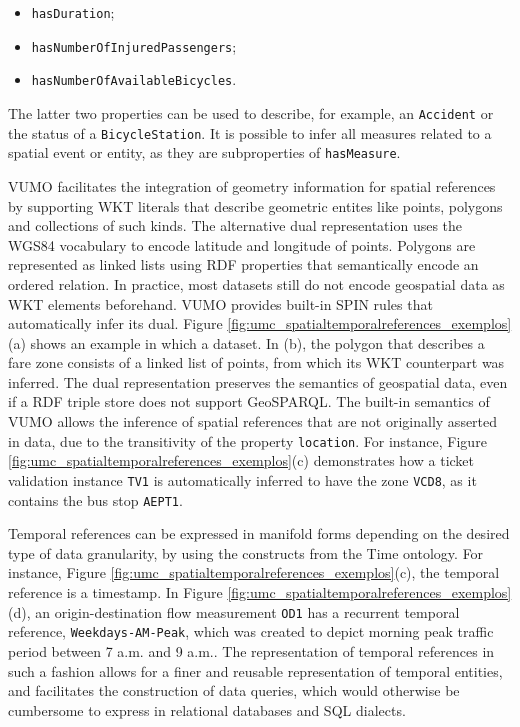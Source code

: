 \documentclass[]{interact}
\theoremstyle{plain}%
\theoremstyle{definition}
\theoremstyle{remark}
\theoremstyle{definition}
\begin{document}
\begin{itemize}
	\item \texttt{hasDuration};
	\item \texttt{hasNumberOfInjuredPassengers};
	\item \texttt{hasNumberOfAvailableBicycles}.
\end{itemize}

The latter two properties can be used to describe, for example, an \texttt{Accident} or the status of a \texttt{BicycleStation}. It is possible to infer all measures related to a spatial event or entity, as they are subproperties of \texttt{hasMeasure}.

VUMO facilitates the integration of geometry information for spatial references by supporting WKT literals that describe geometric entites like points, polygons and collections of such kinds. The alternative dual representation uses the WGS84 vocabulary to encode latitude and longitude of points. Polygons are represented as linked lists using RDF properties that semantically encode an ordered relation. In practice, most datasets still do not encode geospatial data as WKT elements beforehand. VUMO provides built-in SPIN rules that automatically infer its dual. Figure \ref{fig:umc_spatialtemporalreferences_exemplos}(a) shows an example in which a dataset. In (b), the polygon that describes a fare zone consists of a linked list of points, from which its WKT counterpart was inferred. The dual representation preserves the semantics of geospatial data, even if a RDF triple store does not support GeoSPARQL. The built-in semantics of VUMO allows the inference of spatial references that are not originally asserted in data, due to the transitivity of the property \texttt{location}. For instance, Figure \ref{fig:umc_spatialtemporalreferences_exemplos}(c) demonstrates how a ticket validation instance \texttt{TV1} is automatically inferred to have the zone \texttt{VCD8}, as it contains the bus stop \texttt{AEPT1}.

Temporal references can be expressed in manifold forms depending on the desired type of data granularity, by using the constructs from the Time ontology. For instance, Figure \ref{fig:umc_spatialtemporalreferences_exemplos}(c), the temporal reference is a timestamp. In Figure \ref{fig:umc_spatialtemporalreferences_exemplos}(d), an origin-destination flow measurement \texttt{OD1} has a recurrent temporal reference, \texttt{Weekdays-AM-Peak}, which was created to depict morning peak traffic period between 7 a.m. and 9 a.m.. The representation of temporal references in such a fashion allows for a finer and reusable representation of temporal entities, and facilitates the construction of data queries, which would otherwise be cumbersome to express in relational databases and SQL dialects.
\end{document}
